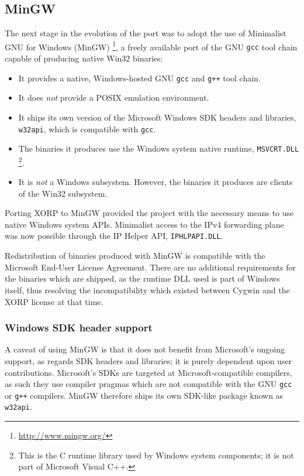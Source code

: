 \documentclass[11pt]{article}
\begin{document}
\subsection{MinGW}

The next stage in the evolution of the port was to adopt the use
of Minimalist GNU for Windows (MinGW)
\footnote{\url{http://www.mingw.org/}},
a freely available port of
the GNU {\tt gcc} tool chain capable of producing native Win32 binaries:
\begin{itemize}
 \item It provides a native, Windows-hosted GNU {\tt gcc} and {\tt g++} tool chain.
 \item It does {\em not} provide a POSIX emulation environment.
 \item It ships its own version of the Microsoft Windows SDK
       headers and libraries, {\tt w32api}, which is compatible with {\tt gcc}.
 \item The binaries it produces use the Windows system native runtime, {\tt MSVCRT.DLL}
       \footnote{This is the C runtime library used by Windows system components;
                 it is not part of Microsoft Visual C++.}.
 \item It is {\em not} a Windows subsystem. However, the binaries it produces
        are clients of the Win32 subsystem.
\end{itemize}

Porting XORP to MinGW provided the project with the necessary means to use
native Windows system APIs.
Minimalist access to the IPv4 forwarding plane was now possible through the
IP Helper API, {\tt IPHLPAPI.DLL}.

Redistribution of binaries produced with MinGW is compatible with the Microsoft
End-User License Agreement. There are no additional requirements for the binaries
which are shipped, as the runtime DLL used is part of Windows itself, thus
resolving the incompatibility which existed between Cygwin and the
XORP license at that time.


\subsubsection{Windows SDK header support}

A caveat of using MinGW is that it does not benefit from Microsoft's
ongoing support, as regards SDK headers and libraries; it is purely dependent
upon user contributions. Microsoft's SDKs are targeted at Microsoft-compatible
compilers, as such they use compiler pragmas which are not compatible with
the GNU {\tt gcc} or {\tt g++} compilers. MinGW therefore ships its own SDK-like package
known as {\tt w32api}.
\end{document}
